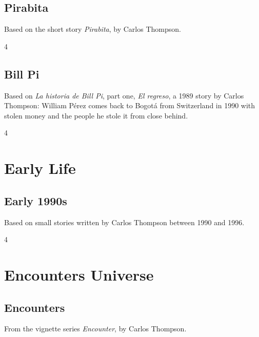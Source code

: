 \documentclass[a4paper,landscape]{memoir}
\begin{document}
\chapter{Pirabita}
Based on the short story \emph{Pirabita}, by Carlos Thompson.
\clearpage\begin{multicols*}{4}




\end{multicols*}

\chapter{Bill Pi}
Based on \emph{La historia de Bill Pi}, part one, \emph{El regreso}, a 1989 story by Carlos Thompson: William Pérez comes back to Bogotá from Switzerland in 1990 with stolen money and the people he stole it from close behind.
\clearpage\begin{multicols*}{4}



\end{multicols*}

\part{Early Life}

\chapter{Early 1990s}
Based on small stories written by Carlos Thompson between 1990 and 1996.
\clearpage\begin{multicols*}{4}











\end{multicols*}

\part{Encounters Universe}

\chapter{Encounters}
From the vignette series \emph{Encounter}, by Carlos Thompson.
\end{document}

